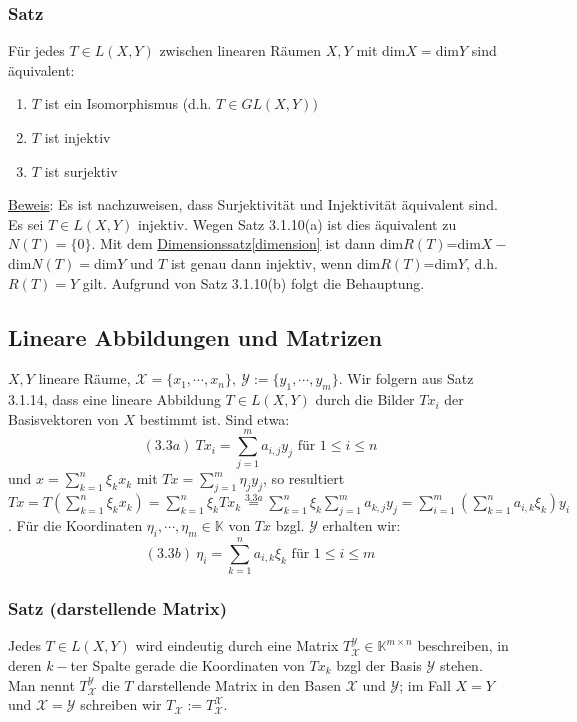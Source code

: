 \subsubsection{Satz}
Für jedes $T\in L(X,Y)$ zwischen linearen Räumen $X,Y$ mit dim$X=$dim$Y$ sind äquivalent:
\renewcommand{\labelenumi}{(\alph{enumi})}
\begin{enumerate}
\item $T$ ist ein Isomorphismus (d.h. $T\in GL(X,Y))$
\item $T$ ist injektiv
\item $T$ ist surjektiv
\end{enumerate}
\underline{Beweis}: Es ist nachzuweisen, dass Surjektivität und Injektivität äquivalent sind.  Es sei $T\in L(X,Y)$ injektiv.  Wegen Satz 3.1.10(a) ist dies äquivalent zu $N(T)=\{0\}$.  Mit dem  \hyperref[dimension]{Dimensionssatz\ref*{dimension}} ist dann dim$R(T)$=dim$X-$dim$N(T)=$dim$Y$ und $T$ ist genau dann injektiv, wenn dim$R(T)$=dim$Y$, d.h. $R(T)=Y$ gilt.  Aufgrund von Satz 3.1.10(b) folgt die Behauptung.
\subsection{Lineare Abbildungen und Matrizen}
$X,Y$ lineare Räume, $\mathcal{X}=\{x_1,\cdots ,x_n\},\ \mathcal{Y}:=\{y_1,\cdots ,y_m\}$.  Wir folgern aus Satz 3.1.14, dass eine lineare Abbildung $T\in L(X,Y)$ durch die Bilder $Tx_i$ der Basisvektoren von $X$ bestimmt ist.  Sind etwa:\\
\[(3.3a)\ Tx_i = \sum_{j=1}^m a_{i,j} y_j\text{ für }1\leq i\leq n\]
und $x=\sum_{k=1}^n\xi _k x_k$ mit $Tx=\sum_{j=1}^m \eta _j y_j$, so resultiert $Tx=T(\sum_{k=1}^n\xi _k x_k)=\sum_{k=1}^n \xi _k Tx_k \stackrel{3.3a}{=} \sum_{k=1}^n\xi _k\sum_{j=1}^ma_{k,j}y_j=\sum_{i=1}^m(\sum_{k=1}^na_{i,k}\xi_k)y_i$.  Für die Koordinaten $\eta _i,\cdots ,\eta _m\in\mathbb{K}$ von $Tx$ bzgl. $\mathcal{Y}$ erhalten wir:\\
\[(3.3b)\ \eta _i=\sum_{k=1}^na_{i,k}\xi _k\text{ für }1\leq i\leq m\]
\subsubsection{Satz (darstellende Matrix)}
Jedes $T\in L(X,Y)$ wird eindeutig durch eine Matrix $T_\mathcal{X}^\mathcal{Y}\in\mathbb{K}^{m\times n}$ beschreiben, in deren $k-$ter Spalte gerade die Koordinaten von $Tx_k$ bzgl der Basis $\mathcal{Y}$ stehen.  Man nennt $T_\mathcal{X}^\mathcal{Y}$ die $T$ darstellende Matrix in den Basen $\mathcal{X}$ und $\mathcal{Y}$; im Fall $X=Y$ und $\mathcal{X}=\mathcal{Y}$ schreiben wir $T_\mathcal{X}:=T^\mathcal{X}_\mathcal{X}$.
